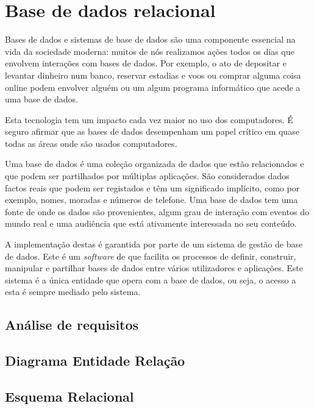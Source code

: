 \documentclass[11pt,twoside,a4paper]{report}
\begin{document}
\section{Base de dados relacional}
Bases de dados e sistemas de base de dados são uma componente essencial na vida da sociedade moderna: muitos de nós realizamos ações todos os dias que envolvem interações com bases de dados. Por exemplo, o ato de depositar e levantar dinheiro num banco, reservar estadias e voos ou comprar alguma coisa online podem envolver alguém ou um algum programa informático que acede a uma base de dados.\par
Esta tecnologia tem um impacto cada vez maior no uso dos computadores. É seguro afirmar que as bases de dados desempenham um papel crítico em quase todas as áreas onde são usados computadores\cite{Elmasri:2010:FDS:1855347}.\par
Uma base de dados é uma coleção organizada de dados que estão relacionados e que podem ser partilhados por múltiplas aplicações\cite{definicao_base_dados}. São considerados dados factos reais que podem ser registados e têm um significado implícito, como por exemplo, nomes, moradas e números de telefone. Uma base de dados tem uma fonte de onde os dados são provenientes, algum grau de interação com eventos do mundo real e uma audiência que está ativamente interessada no seu conteúdo.\par
A implementação destas é garantida por parte de um sistema de gestão de base de dados. Este é um \textit{software} de que facilita os processos de definir, construir, manipular e partilhar bases de dados entre vários utilizadores e aplicações. Este sistema é a única entidade que opera com a base de dados, ou seja, o acesso a esta é sempre mediado pelo sistema. 
\subsection{Análise de requisitos}
\subsection{Diagrama Entidade Relação}
\subsection{Esquema Relacional}
\end{document}
